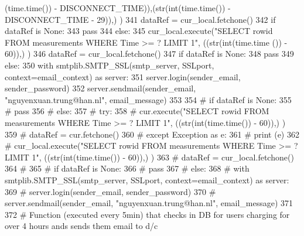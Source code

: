 \begin{DoxyCode}
      (time.time()) - DISCONNECT\_TIME)),(str(int(time.time()) - DISCONNECT\_TIME - 29)),) )
341         dataRef = cur\_local.fetchone()
342         \textcolor{keywordflow}{if} dataRef \textcolor{keywordflow}{is} \textcolor{keywordtype}{None}:
343             \textcolor{keywordflow}{pass}
344         \textcolor{keywordflow}{else}:
345             cur\_local.execute(\textcolor{stringliteral}{"SELECT rowid FROM measurements WHERE Time >= ? LIMIT 1"}, ((str(int(time.time
      ()) - 60)),) )
346             dataRef = cur\_local.fetchone()
347             \textcolor{keywordflow}{if} dataRef \textcolor{keywordflow}{is} \textcolor{keywordtype}{None}:
348                 \textcolor{keywordflow}{pass}
349             \textcolor{keywordflow}{else}:
350                 with smtplib.SMTP\_SSL(smtp\_server, SSLport, context=email\_context) \textcolor{keyword}{as} server:
351                     server.login(sender\_email, sender\_password)                    
352                     server.sendmail(sender\_email, \textcolor{stringliteral}{"nguyenxuan.trung@han.nl"}, email\_message)
353             
354 \textcolor{comment}{#     if dataRef is None:}
355 \textcolor{comment}{#         pass}
356 \textcolor{comment}{#     else:}
357 \textcolor{comment}{#         try:}
358 \textcolor{comment}{#             cur.execute("SELECT rowid FROM measurements WHERE Time >= ? LIMIT 1", ((str(int(time.time())
       - 60)),) )}
359 \textcolor{comment}{#             dataRef = cur.fetchone()}
360 \textcolor{comment}{#         except Exception as e:}
361 \textcolor{comment}{#             print (e)}
362 \textcolor{comment}{#             cur\_local.execute("SELECT rowid FROM measurements WHERE Time >= ? LIMIT 1",
       ((str(int(time.time()) - 60)),) )}
363 \textcolor{comment}{#             dataRef = cur\_local.fetchone()}
364 \textcolor{comment}{#             }
365 \textcolor{comment}{#         if dataRef is None:}
366 \textcolor{comment}{#             pass}
367 \textcolor{comment}{#         else:}
368 \textcolor{comment}{#             with smtplib.SMTP\_SSL(smtp\_server, SSLport, context=email\_context) as server:}
369 \textcolor{comment}{#                 server.login(sender\_email, sender\_password)                    }
370 \textcolor{comment}{#                 server.sendmail(sender\_email, "nguyenxuan.trung@han.nl", email\_message)}
371 
372 \textcolor{comment}{# Function (executed every 5min) that checks in DB for users charging for over 4 hours ands sends them
       email to d/c}
\end{DoxyCode}
\mbox{\label{namespace_s_q_lfunction_a526fa5bc764d15233b0cc1880fc33f83}} 
